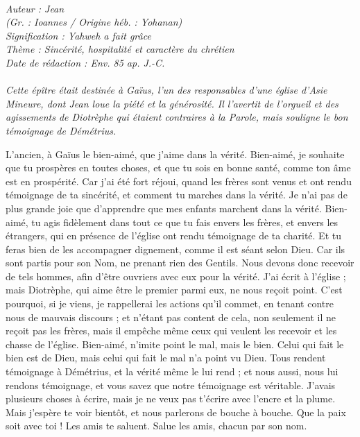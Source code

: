 \BFont
\noindent\hrulefill
{\footnotesize
\textit{
\bigskip
{\centering{}
\\Auteur : Jean
\\(Gr. : Ioannes / Origine héb. : Yohanan)
\\Signification : Yahweh a fait grâce
\\Thème : Sincérité, hospitalité et caractère du chrétien
\\Date de rédaction : Env. 85 ap. J.-C.\\}
}
\textit{
\\Cette épître était destinée à Gaïus, l'un des responsables d'une église d'Asie Mineure, dont Jean loue la piété et la générosité. Il l'avertit de l'orgueil et des agissements de Diotrèphe qui étaient contraires à la Parole, mais souligne le bon témoignage de Démétrius.\bigskip
}
}
\par\nobreak\noindent\hrulefill
\begin{multicols}{2}
\VerseOne{}L'ancien, à Gaïus le bien-aimé, que j'aime dans la vérité.
Bien-aimé, je souhaite que tu prospères en toutes choses, et que tu sois en bonne santé, comme ton âme est en prospérité.
Car j'ai été fort réjoui, quand les frères sont venus et ont rendu témoignage de ta sincérité, et comment tu marches dans la vérité.
Je n'ai pas de plus grande joie que d'apprendre que mes enfants marchent dans la vérité.
Bien-aimé, tu agis fidèlement dans tout ce que tu fais envers les frères, et envers les étrangers,
qui en présence de l'église ont rendu témoignage de ta charité. Et tu feras bien de les accompagner dignement, comme il est séant selon Dieu.
Car ils sont partis pour son Nom, ne prenant rien des Gentils.
Nous devons donc recevoir de tels hommes, afin d'être ouvriers avec eux pour la vérité.
J'ai écrit à l'église ; mais Diotrèphe, qui aime être le premier parmi eux, ne nous reçoit point.
C'est pourquoi, si je viens, je rappellerai les actions qu'il commet, en tenant contre nous de mauvais discours ; et n'étant pas content de cela, non seulement il ne reçoit pas les frères, mais il empêche même ceux qui veulent les recevoir et les chasse de l'église.
Bien-aimé, n'imite point le mal, mais le bien. Celui qui fait le bien est de Dieu, mais celui qui fait le mal n'a point vu Dieu.
Tous rendent témoignage à Démétrius, et la vérité même le lui rend ; et nous aussi, nous lui rendons témoignage, et vous savez que notre témoignage est véritable.
J'avais plusieurs choses à écrire, mais je ne veux pas t'écrire avec l'encre et la plume.
Mais j'espère te voir bientôt, et nous parlerons de bouche à bouche.
Que la paix soit avec toi ! Les amis te saluent. Salue les amis, chacun par son nom.
\PPE{}
\end{multicols}
